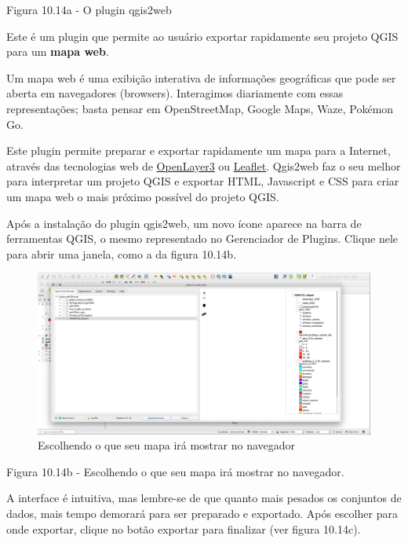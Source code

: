 \documentclass[
]{krantz}
\begin{document}
Figura 10.14a - O plugin qgis2web

Este é um plugin que permite ao usuário exportar rapidamente seu projeto QGIS para um \textbf{mapa web}.

Um mapa web é uma exibição interativa de informações geográficas que pode ser aberta em navegadores (browsers). Interagimos diariamente com essas representações; basta pensar em OpenStreetMap, Google Maps, Waze, Pokémon Go.

Este plugin permite preparar e exportar rapidamente um mapa para a Internet, através das tecnologias web de \href{https://openlayers.org/}{OpenLayer3} ou \href{https://leafletjs.com/}{Leaflet}. Qgis2web faz o seu melhor para interpretar um projeto QGIS e exportar HTML, Javascript e CSS para criar um mapa web o mais próximo possível do projeto QGIS.

Após a instalação do plugin qgis2web, um novo ícone aparece na barra de ferramentas QGIS, o mesmo representado no Gerenciador de Plugins. Clique nele para abrir uma janela, como a da figura 10.14b.

\begin{figure}
\centering
\includegraphics{media/modulo10/fig1014_b.png}
\caption{Escolhendo o que seu mapa irá mostrar no navegador}
\end{figure}

Figura 10.14b - Escolhendo o que seu mapa irá mostrar no navegador.

A interface é intuitiva, mas lembre-se de que quanto mais pesados \hspace{0pt}\hspace{0pt}os conjuntos de dados, mais tempo demorará para ser preparado e exportado. Após escolher para onde exportar, clique no botão exportar para finalizar (ver figura 10.14c).
\end{document}
